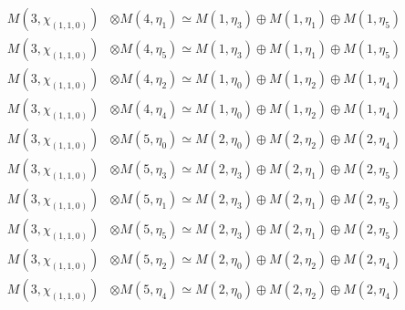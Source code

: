 \begin{align*}
M(3,\chi_{(1,1,0)}) &\otimes M(4,\eta_{1}) \simeq M(1,\eta_{3}) \oplus M(1,\eta_{1}) \oplus M(1,\eta_{5})\\
M(3,\chi_{(1,1,0)}) &\otimes M(4,\eta_{5}) \simeq M(1,\eta_{3}) \oplus M(1,\eta_{1}) \oplus M(1,\eta_{5})\\
M(3,\chi_{(1,1,0)}) &\otimes M(4,\eta_{2}) \simeq M(1,\eta_{0}) \oplus M(1,\eta_{2}) \oplus M(1,\eta_{4})\\
M(3,\chi_{(1,1,0)}) &\otimes M(4,\eta_{4}) \simeq M(1,\eta_{0}) \oplus M(1,\eta_{2}) \oplus M(1,\eta_{4})\\
M(3,\chi_{(1,1,0)}) &\otimes M(5,\eta_{0}) \simeq M(2,\eta_{0}) \oplus M(2,\eta_{2}) \oplus M(2,\eta_{4})\\
M(3,\chi_{(1,1,0)}) &\otimes M(5,\eta_{3}) \simeq M(2,\eta_{3}) \oplus M(2,\eta_{1}) \oplus M(2,\eta_{5})\\
M(3,\chi_{(1,1,0)}) &\otimes M(5,\eta_{1}) \simeq M(2,\eta_{3}) \oplus M(2,\eta_{1}) \oplus M(2,\eta_{5})\\
M(3,\chi_{(1,1,0)}) &\otimes M(5,\eta_{5}) \simeq M(2,\eta_{3}) \oplus M(2,\eta_{1}) \oplus M(2,\eta_{5})\\
M(3,\chi_{(1,1,0)}) &\otimes M(5,\eta_{2}) \simeq M(2,\eta_{0}) \oplus M(2,\eta_{2}) \oplus M(2,\eta_{4})\\
M(3,\chi_{(1,1,0)}) &\otimes M(5,\eta_{4}) \simeq M(2,\eta_{0}) \oplus M(2,\eta_{2}) \oplus M(2,\eta_{4})\\
\end{align*}

